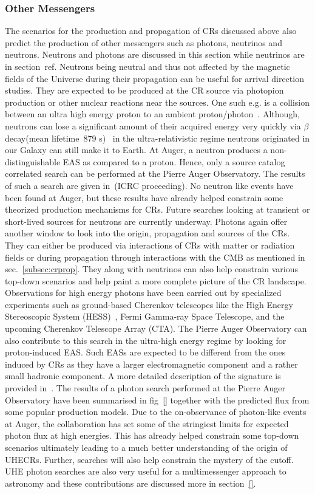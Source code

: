\subsubsection*{Other Messengers}
\label{subsubsec:CRmessengers}
The scenarios for the production and propagation of CRs discussed above also predict the production of other messengers such as photons, neutrinos and neutrons. Neutrons and photons are discussed in this section while neutrinos are in section~ref{}. 
Neutrons being neutral and thus not affected by the magnetic fields of the Universe during their propagation can be useful for arrival direction studies. They are expected to be produced at the CR source via photopion production or other nuclear reactions near the sources. One such e.g. is a collision between an ultra high energy proton to an ambient proton/photon~\cite{}. Although, neutrons can lose a significant amount of their acquired energy very quickly via $\beta$ decay(mean lifetime~879 s)~\cite{} in the ultra-relativistic regime neutrons originated in our Galaxy can still make it to Earth. At Auger, a neutron produces a non-distinguishable EAS as compared to a proton. Hence, only a source catalog correlated search can be performed at the Pierre Auger Observatory. The results of such a search are given in~\cite{}(ICRC proceeding). No neutron like events have been found at Auger, but these results have already helped constrain some theorized production mechanisms for CRs. Future searches looking at transient or short-lived sources for neutrons are currently underway. 
Photons again offer another window to look into the origin, propagation and sources of the CRs. They can either be produced via interactions of CRs with matter or radiation fields or during propagation through interactions with the CMB as mentioned in sec.~\ref{subsec:crprop}. They along with neutrinos can also help constrain various top-down scenarios and help paint a more complete picture of the CR landscape. Observations for high energy photons have been carried out by specialized experiments such as ground-based Cherenkov telescopes like the High Energy Stereoscopic System (HESS)~\cite{}, Fermi Gamma-ray Space Telescope, and the upcoming Cherenkov Telescope Array (CTA). The Pierre Auger Observatory can also contribute to this search in the ultra-high energy regime by looking for proton-induced EAS. Such EASs are expected to be different from the ones induced by CRs as they have a larger electromagnetic component and a rather small hadronic component. A more detailed description of the signature is provided in~\cite{}. The results of a photon search performed at the Pierre Auger Observatory have been summarised in fig~\ref{} together with the predicted flux from some popular production models. Due to the on-observance of photon-like events at Auger, the collaboration has set some of the stringiest limits for expected photon flux at high energies. This has already helped constrain some top-down scenarios ultimately leading to a much better understanding of the origin of UHECRs. Further, searches will also help constrain the mystery of the cutoff. UHE photon searches are also very useful for a multimessenger approach to astronomy and these contributions are discussed more in section~\ref{}.


